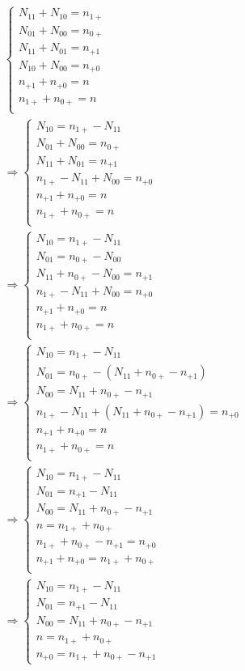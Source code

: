 \documentclass{article}
\begin{document}
\begin{align*}
\begin{cases}
N_{11}+N_{10} = n_{1+} \\
N_{01}+N_{00} = n_{0+} \\
N_{11}+N_{01} = n_{+1} \\
N_{10}+N_{00} = n_{+0} \\
n_{+1}+n_{+0} = n \\
n_{1+}+n_{0+} = n \\
\end{cases} \\
\Rightarrow
\begin{cases}
N_{10} = n_{1+}-N_{11} \\
N_{01}+N_{00} = n_{0+} \\
N_{11}+N_{01} = n_{+1} \\
n_{1+}-N_{11}+N_{00} = n_{+0} \\
n_{+1}+n_{+0} = n \\
n_{1+}+n_{0+} = n \\
\end{cases} \\
\Rightarrow
\begin{cases}
N_{10} = n_{1+}-N_{11} \\
N_{01} = n_{0+}-N_{00} \\
N_{11}+n_{0+}-N_{00} = n_{+1} \\
n_{1+}-N_{11}+N_{00} = n_{+0} \\
n_{+1}+n_{+0} = n \\
n_{1+}+n_{0+} = n \\
\end{cases} \\
\Rightarrow
\begin{cases}
N_{10} = n_{1+}-N_{11} \\
N_{01} = n_{0+}-(N_{11}+n_{0+}-n_{+1}) \\
N_{00} = N_{11}+n_{0+}-n_{+1} \\
n_{1+}-N_{11}+(N_{11}+n_{0+}-n_{+1}) = n_{+0} \\
n_{+1}+n_{+0} = n \\
n_{1+}+n_{0+} = n \\
\end{cases} \\
\Rightarrow
\begin{cases}
N_{10} = n_{1+}-N_{11} \\
N_{01} = n_{+1}-N_{11} \\
N_{00} = N_{11}+n_{0+}-n_{+1} \\
n = n_{1+}+n_{0+} \\
n_{1+}+n_{0+}-n_{+1} = n_{+0} \\
n_{+1}+n_{+0} = n_{1+}+n_{0+} \\
\end{cases} \\
\Rightarrow
\begin{cases}
N_{10} = n_{1+}-N_{11} \\
N_{01} = n_{+1}-N_{11} \\
N_{00} = N_{11}+n_{0+}-n_{+1} \\
n = n_{1+}+n_{0+} \\
n_{+0} = n_{1+}+n_{0+}-n_{+1}
\end{cases} \\
\end{align*}
\end{document}
